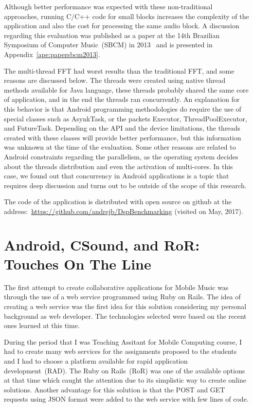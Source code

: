 Although better performance was expected with these non-traditional approaches, running C/C++ code for small blocks increases the complexity of the application and also the cost for processing the same audio block.
A discussion regarding this evaluation was published as a paper at the 14th Brazilian Symposium of Computer Music~(SBCM) in 2013~\citep{deCarvalhoJunior2013fftbenchmark} and is presented in Appendix~\ref{ape:papersbcm2013}.

The multi-thread FFT had worst results than the traditional FFT, and some reasons are discussed below.
The threads were created using native thread methods available for Java language, these threads probably shared the same core of application, and in the end the threads ran concurrently.
An explanation for this behavior is that Android programming methodologies do require the use of special classes such as AsynkTask, or the packets Executor, ThreadPoolExecutor, and FutureTask.
Depending on the API and the device limitations, the threads created with these classes will provide better performance, but this information was unknown at the time of the evaluation.
Some other reasons are related to Android constraints regarding the parallelism, as the operating system decides about the threads distribution and even the activation of multi-cores.
In this case, we found out that concurrency in Android applications is a topic that requires deep discussion and turns out to be outside of the scope of this research.

The code of the application is distributed with open source on github at the address:~\url{https://github.com/andrejb/DspBenchmarking} (visited on May, 2017).

\section{Android, CSound, and RoR: Touches On The Line}
\label{apesec:apptouchesontheline}

The first attempt to create collaborative applications for Mobile Music was through the use of a web service programmed using Ruby on Rails.
The idea of creating a web service was the first idea for this solution considering my personal background as web developer.
The technologies selected were based on the recent ones learned at this time.

During the period that I was Teaching Assitant for Mobile Computing course, I had to create many web services for the assignments proposed to the students and I had to choose a platform available for rapid application development~(RAD).
The Ruby on Rails~(RoR) was one of the available options at that time which caught the attention due to its simplistic way to create online solutions.
Another advantage for this solution is that the POST and GET requests using JSON format were added to the web service with few lines of code.

